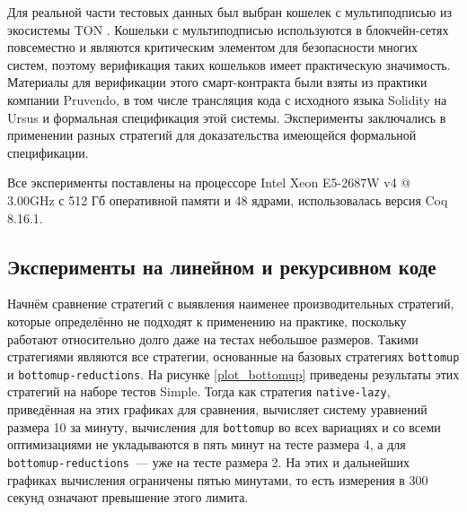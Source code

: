 \documentclass[../thesis.tex]{subfiles}
\begin{document}
Для реальной части тестовых данных был выбран кошелек с мультиподписью из экосистемы TON \cite{multisig}. Кошельки с мультиподписью используются в блокчейн-сетях повсеместно \cite{wallets_survey} и являются критическим элементом для безопасности многих систем, поэтому верификация таких кошельков имеет практическую значимость. Материалы для верификации этого смарт-контракта были взяты из практики компании Pruvendo, в том числе трансляция кода с исходного языка Solidity на Ursus и формальная спецификация этой системы. Эксперименты заключались в применении разных стратегий для доказательства имеющейся формальной спецификации.

Все эксперименты поставлены на процессоре Intel Xeon E5-2687W v4 @ 3.00GHz с 512 Гб оперативной памяти и 48 ядрами, использовалась версия Coq 8.16.1.

\subsection{Эксперименты на линейном и рекурсивном коде}

Начнём сравнение стратегий с выявления наименее производительных стратегий, которые определённо не подходят к применению на практике, поскольку работают относительно долго даже на тестах небольшое размеров. Такими стратегиями являются все стратегии, основанные на базовых стратегиях \texttt{bottomup} и \texttt{bottomup-reductions}. На рисунке \ref{plot_bottomup} приведены результаты этих стратегий на наборе тестов Simple. Тогда как стратегия \texttt{native-lazy}, приведённая на этих графиках для сравнения, вычисляет систему уравнений размера 10 за минуту, вычисления для \texttt{bottomup} во всех вариациях и со всеми оптимизациями не укладываются в пять минут на тесте размера 4, а для \texttt{bottomup-reductions}~--- уже на тесте размера 2. На этих и дальнейших графиках вычисления ограничены пятью минутами, то есть измерения в 300 секунд означают превышение этого лимита. 

\graphicspath{ {../images/} }
\end{document}
